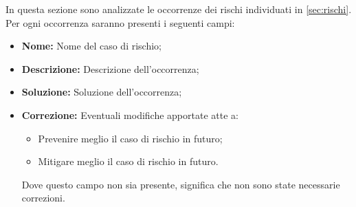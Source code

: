 In questa sezione sono analizzate le occorrenze dei rischi individuati in \cref{sec:rischi}. Per ogni occorrenza saranno presenti i seguenti campi:
\begin{itemize}
	\item \textbf{Nome: }Nome del caso di rischio;
	\item \textbf{Descrizione: }Descrizione dell'occorrenza;
	\item \textbf{Soluzione: }Soluzione dell'occorrenza;
	\item \textbf{Correzione: }Eventuali modifiche apportate atte a:
			\begin{itemize}
				\item Prevenire meglio il caso di rischio in futuro;
				\item Mitigare meglio il caso di rischio in futuro.
			\end{itemize}
			Dove questo campo non sia presente, significa che non sono state necessarie correzioni.
\end{itemize}
